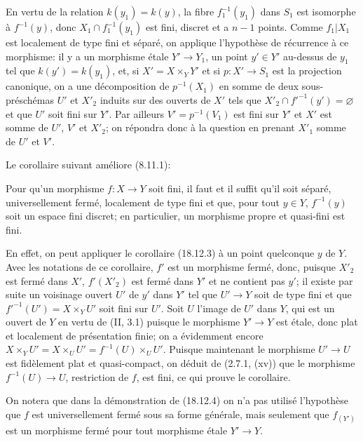 
En vertu de la relation $k(y_1)=k(y)$, la fibre $f_1^{-1}(y_1)$ dans $S_1$ est isomorphe à $f^{-1}(y)$, donc $X_1\cap f_1^{-1}(y_1)$ est fini, discret et a $n-1$ points. Comme $f_1|X_1$ est localement de type fini et séparé, on applique l'hypothèse de récurrence à ce morphisme: il y a un morphisme étale $Y'\to Y_1$, un point $y'\in Y'$ au-dessus de $y_1$ tel que $k(y')=k(y_1)$, et, si $X'=X\times_Y Y'$ et si $p:X'\to S_1$ est la projection canonique, on a une décomposition de $p^{-1}(X_1)$ en somme de deux sous-préschémas $U'$ et $X'_2$ induits sur des ouverts de $X'$ tels que $X'_2\cap f'^{-1}(y')=\varnothing$ et que $U'$ soit fini sur $Y'$. Par ailleurs $V'=p^{-1}(V_1)$ est fini sur $Y'$ et $X'$ est somme de $U'$, $V'$ et $X'_2$; on répondra donc à la question en prenant $X'_1$ somme de $U'$ et $V'$.

Le corollaire suivant améliore (8.11.1):

\begin{corollary}[18.12.4]
\label{IV.18.12.4}
Pour qu'un morphisme $f:X\to Y$ soit fini, il faut et il suffit qu'il soit séparé, universellement fermé, localement de type fini et que, pour tout $y\in Y$, $f^{-1}(y)$ soit un espace fini discret; en particulier, un morphisme propre et quasi-fini est fini.
\end{corollary}

En effet, on peut appliquer le corollaire (18.12.3) à un point quelconque $y$ de $Y$. Avec les notations de ce corollaire, $f'$ est un morphisme fermé, donc, puisque $X'_2$ est fermé dans $X'$, $f'(X'_2)$ est fermé dans $Y'$ et ne contient pas $y'$; il existe par suite un voisinage ouvert $U'$ de $y'$ dans $Y'$ tel que $U'\to Y$ soit de type fini et que $f'^{-1}(U')=X\times_Y U'$ soit fini sur $U'$. Soit $U$ l'image de $U'$ dans $Y$, qui est un ouvert de $Y$ en vertu de (II, 3.1) puisque le morphisme $Y'\to Y$ est étale, donc plat et localement de présentation finie; on a évidemment encore $X\times_Y U'=X\times_U U'=f^{-1}(U)\times_U U'$. Puisque maintenant le morphisme $U'\to U$ est fidèlement plat et quasi-compact, on déduit de (2.7.1, (xv)) que le morphisme $f^{-1}(U)\to U$, restriction de $f$, est fini, ce qui prouve le corollaire.

\begin{remark}[18.12.5]
\label{IV.18.12.5}
On notera que dans la démonstration de (18.12.4) on n'a pas utilisé l'hypothèse que $f$ est universellement fermé sous sa forme générale, mais seulement que $f_{(Y')}$ est un morphisme fermé pour tout morphisme étale $Y'\to Y$.
\end{remark}

